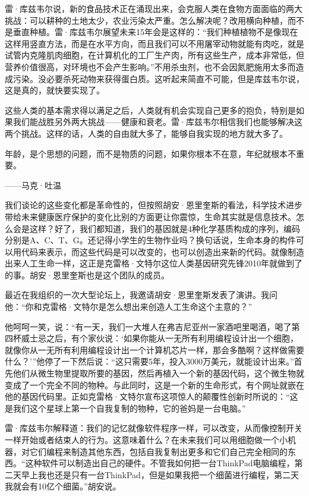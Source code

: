 雷·库兹韦尔说，新的食品技术正在涌现出来，会克服人类在食物方面面临的两大挑战：可以耕种的土地太少，农业污染太严重。怎么解决呢？改用横向种植，而不是垂直种植。雷·库兹韦尔展望未来15年会是这样的：“我们种植植物不是像现在这样用竖直方法，而是在水平方向，而且我们可以不用屠宰动物就能有肉吃，就是试管内克隆肌肉细胞，在计算机化的工厂生产肉，所有这些生产，成本非常低，但营养价值很高，对环境也不会产生影响。”不用杀虫剂，也不会因氮肥施用太多而造成污染。没必要杀死动物来获得蛋白质。这听起来简直不可能，但是库兹韦尔说，这是真的，就快要实现了。

这些人类的基本需求得以满足之后，人类就有机会实现自己更多的抱负，特别是如果我们能战胜另外两大挑战——健康和衰老。雷·库兹韦尔相信我们也能够解决这两个挑战。这样的话，人类的自由就大多了，能够自我实现的地方就大多了。

\begin{BookQuote}
年龄，是个思想的问题，而不是物质的问题，如果你根本不在意，年纪就根本不重要。

\hfill ——马克·吐温
\end{BookQuote}

我们谈论的这些变化都是革命性的，但按照胡安·恩里奎斯的看法，科学技术进步带给未来健康医疗保护的变化比别的方面更让你震惊，生命其实就是信息技术。怎么会是这样？好了，我们都知道，我们的基因就是4种化学基质构成的序列，编码分别是A、C、T、G。还记得小学生的生物作业吗？换句话说，生命本身的构件可以用代码来表示，而这些代码是可以改变的，也可以创造出来新的代码。就像制造出来人工生命一样，这正是克雷格·文特尔这位人类基因研究先锋2010年就做到了的事。胡安·恩里奎斯也是这个团队的成员。

最近在我组织的一次大型论坛上，我邀请胡安·恩里奎斯发表了演讲。我问他：“你和克雷格·文特尔是怎么想出来创造人工生命这个主意的？”

他呵呵一笑，说：“有一天，我们一大堆人在弗吉尼亚州一家酒吧里喝酒，喝了第四杯威士忌之后，有个家伙说：‘如果你能从一无所有利用编程设计出一个细胞，就像你从一无所有利用编程设计出一个计算机芯片一样，那会多酷啊？这样做需要什么？’”他停了一下然后说：“这只需要5年，投入3000万美元，就能设计出来。”首先他们从微生物里提取所要的基因，然后再植入一个新的基因代码，这个微生物就变成了一个完全不同的物种。与此同时，这是一个新的生命形式，有个网址就嵌在他的基因代码里。正如克雷格·文特尔宣布这项惊人的颠覆性创新时所说的：“这是我们这个星球上第一个自我复制的物种，它的爸妈是一台电脑。”

雷·库兹韦尔解释道：我们的记忆就像软件程序一样，可以改变，从而像控制开关一样开始或者结束人的行为。这意味着什么？在未来我们可以用细胞做一个小机器，对它们编程来制造其他东西，包括自我复制出更多和它们自己完全相同的东西。“这种软件可以制造出自己的硬件。不管我如何把一台ThinkPad电脑编程，第二天早上我也还是只有一台ThinkPad，但是如果我把一个细菌进行编程，第二天我就会有10亿个细菌。”胡安说。

